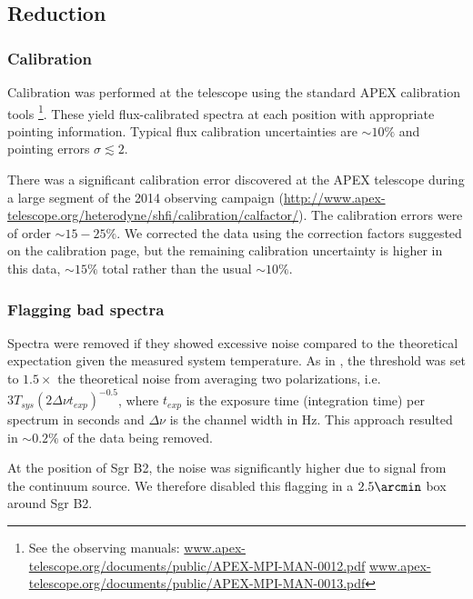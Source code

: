 \subsection{Reduction}
\subsubsection{Calibration}
Calibration was performed at the telescope using the standard APEX calibration
tools
\footnote{See the observing manuals:
\url{www.apex-telescope.org/documents/public/APEX-MPI-MAN-0012.pdf}
\url{www.apex-telescope.org/documents/public/APEX-MPI-MAN-0013.pdf} }.
These yield flux-calibrated spectra at each position with appropriate pointing
information.  Typical flux calibration uncertainties are $\sim10\%$ and
pointing errors $\sigma\lesssim2$\arcsec. %

There was a significant calibration error discovered at the APEX telescope during
a large segment of the 2014 observing campaign
(\url{http://www.apex-telescope.org/heterodyne/shfi/calibration/calfactor/}).
The calibration errors were of order $\sim15-25\%$.  We corrected the data using
the correction factors suggested on the calibration page, but the remaining
calibration uncertainty is higher in this data, $\sim15\%$ total rather than
the usual $\sim10\%$.

\subsubsection{Flagging bad spectra}
\label{sec:flagging}
Spectra were removed if they showed excessive noise compared to the
theoretical expectation given the measured system temperature.  As in
\citet{Ao2013a}, the threshold was set to $1.5\times$ the theoretical noise
from averaging two polarizations,
i.e. $3 T_{sys} (2 \Delta\nu t_{exp})^{-0.5}$, where $t_{exp}$ is the
exposure time (integration time) per spectrum in seconds and $\Delta\nu$ is the
channel width in Hz.  This approach resulted in $\sim0.2\%$ of the data being
removed.  

At the position of Sgr B2, the noise was significantly higher due to signal
from the continuum source.  We therefore disabled this flagging in a
$2.5\arcmin$ box around Sgr B2.


